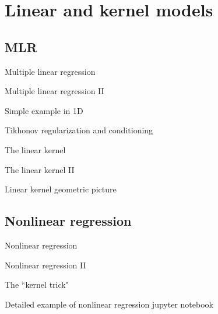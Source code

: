 \section{Linear and kernel models}
\subsection{MLR}
\begin{frame}[t]{Multiple linear regression}

\end{frame}
\begin{frame}[t]{Multiple linear regression II}

\end{frame}
\begin{frame}[t]{Simple example in 1D}

\end{frame}

\begin{frame}[t]{Tikhonov regularization and conditioning}

\end{frame}

\begin{frame}{The linear kernel}

\end{frame}
\begin{frame}{The linear kernel II}

\end{frame}
\begin{frame}{Linear kernel geometric picture}

\end{frame}
\subsection{Nonlinear regression}
\begin{frame}[t]{Nonlinear regression}

\end{frame}
\begin{frame}[t]{Nonlinear regression II}

\end{frame}
\begin{frame}[t]{The ``kernel trick"}

\end{frame}
\begin{frame}[t]{Detailed example of nonlinear regression}
jupyter notebook
\end{frame}

